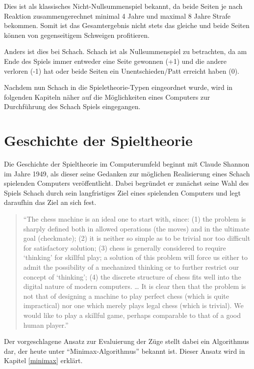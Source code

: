 Dies ist als klassisches Nicht-Nullsummenspiel bekannt, da beide Seiten je nach Reaktion zusammengerechnet minimal 4 Jahre und maximal 8 Jahre Strafe bekommen. Somit ist das Gesamtergebnis nicht stets das gleiche und beide Seiten können von gegenseitigem Schweigen profitieren.

Anders ist dies bei Schach. Schach ist als Nullsummenspiel zu betrachten, da am Ende des Spiels immer entweder eine Seite gewonnen (+1) und die andere verloren (-1) hat oder beide Seiten ein Unentschieden/Patt erreicht haben (0).

Nachdem nun Schach in die Spieletheorie-Typen eingeordnet wurde, wird in folgenden Kapiteln näher auf die Möglichkeiten eines Computers zur Durchführung des Schach Spiels  eingegangen.



\section{Geschichte der Spieltheorie}\label{history}

Die Geschichte der Spieltheorie im Computerumfeld beginnt mit Claude Shannon im Jahre 1949, als dieser seine Gedanken zur möglichen Realisierung eines Schach spielenden Computers veröffentlicht. Dabei begründet er zunächst seine Wahl des Spiels Schach durch sein langfristiges Ziel eines spielenden Computers und legt daraufhin das Ziel an sich fest.

\begin{quote}
“The chess machine is an ideal one to start with, since: (1) the problem is sharply defined both in allowed operations (the moves) and in the ultimate goal (checkmate); (2) it is neither so simple as to be trivial nor too difficult for satisfactory solution; (3) chess is generally considered to require ‘thinking’ for skillful play; a solution of this problem will force us either to admit the possibility of a mechanized thinking or to further restrict our concept of ‘thinking’; (4) the discrete structure of chess fits well into the digital nature of modern computers. … It is clear then that the problem is not that of designing a machine to play perfect chess (which is quite impractical) nor one which merely plays legal chess (which is trivial). We would like to play a skillful game, perhaps comparable to that of a good human player.” \cite{Shannon1950}
\end{quote} 

Der vorgeschlagene Ansatz zur Evaluierung der Züge stellt dabei ein Algorithmus dar, der heute unter ``Minimax-Algorithmus'' bekannt ist. Dieser Ansatz wird in Kapitel \ref{minimax} erklärt.

